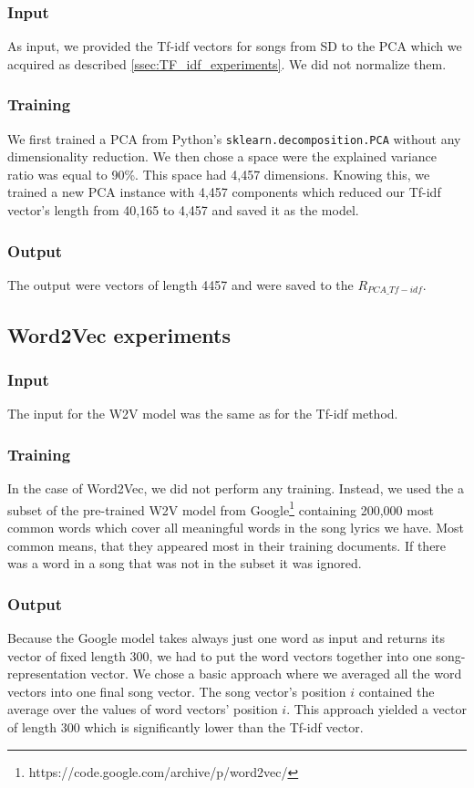 \subsubsection{Input}
As input, we provided the Tf-idf vectors for songs from SD to the PCA which we acquired as described \ref{ssec:TF_idf_experiments}. We did not normalize them.

\subsubsection{Training}
We first trained a PCA from Python's \texttt{sklearn.decomposition.PCA} without any dimensionality reduction. We then chose a space were the explained variance ratio was equal to 90\%. This space had 4,457 dimensions. Knowing this, we trained a new PCA instance with 4,457 components which reduced our Tf-idf vector's length from 40,165 to 4,457 and saved it as the model.

\subsubsection{Output}
The output were vectors of length 4457 and were saved to the $R_{PCA\_Tf-idf}$.

\subsection{Word2Vec experiments}\label{ssec:w2v_experiments}

\subsubsection{Input}
The input for the W2V model was the same as for the Tf-idf method.

\subsubsection{Training}
In the case of Word2Vec, we did not perform any training. Instead, we used the a subset of the pre-trained W2V model from Google\footnote{https://code.google.com/archive/p/word2vec/} containing 200,000 most common words which cover all meaningful words in the song lyrics we have. Most common means, that they appeared most in their training documents. If there was a word in a song that was not in the subset it was ignored. 

\subsubsection{Output}
Because the Google model takes always just one word as input and returns its vector of fixed length 300, we had to put the word vectors together into one song-representation vector. We chose a basic approach where we averaged all the word vectors into one final song vector. The song vector's position $i$ contained the average over the values of word vectors' position $i$. This approach yielded a vector of length 300 which is significantly lower than the Tf-idf vector.\\

